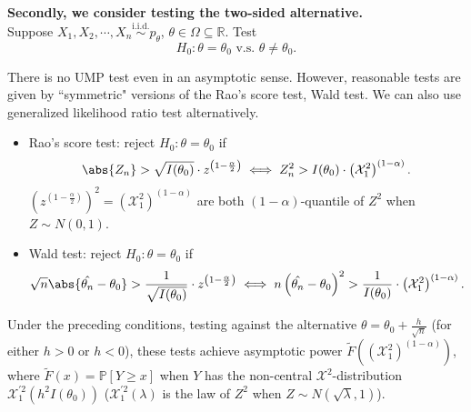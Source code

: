 \documentclass[a4paper]{article}
\begin{document}
\noindent \textbf{Secondly, we consider testing the two-sided alternative.} \\

\noindent Suppose $X_1,X_2,\cdots,X_n \stackrel{\text{i.i.d.}}{\sim} p_{\theta}$, $\theta \in \Omega \subseteq \mathbb{R}$. Test
\begin{equation*}
	H_0: \theta = \theta_0 \text{ v.s. } \theta \neq \theta_0.
\end{equation*}

\begin{answer}
	There is no UMP test even in an asymptotic sense. However, reasonable tests are given by ``symmetric" versions of the Rao's score test, Wald test. We can also use generalized likelihood ratio test alternatively.
\end{answer}

\begin{itemize}[leftmargin=*]
	\item Rao's score test: reject $H_0: \theta = \theta_0$ if
	\begin{equation*}
		\abs{Z_n} > \sqrt{I(\theta_0)} \cdot z^{\left(1-\frac{\alpha}{2}\right)} \iff Z_n^2 > I(\theta_0) \cdot \left(\mathcal{X}_1^2\right)^{(1-\alpha)}.
	\end{equation*}
	$\left(z^{(1-\frac{\alpha}{2})}\right)^2 = \left(\mathcal{X}_1^2\right)^{(1-\alpha)}$ are both $(1-\alpha)$-quantile of $Z^2$ when $Z \sim N(0,1)$.
	\item Wald test:  reject $H_0: \theta = \theta_0$ if
	\begin{equation*}
		\sqrt{n} \abs{\hat{\theta_n} - \theta_0} > \frac{1}{\sqrt{I(\theta_0)}} \cdot z^{\left(1-\frac{\alpha}{2}\right)} \iff n \left(\hat{\theta_n} - \theta_0\right)^2 > \frac{1}{I(\theta_0)} \cdot \left(\mathcal{X}_1^2\right)^{(1-\alpha)}.
	\end{equation*}
\end{itemize}

\begin{prop}
	Under the preceding conditions, testing against the alternative $\theta = \theta_0 + \frac{h}{\sqrt{n}}$ (for either $h > 0$ or $h < 0$), these tests achieve asymptotic power $\tilde{F} \left(\left(\mathcal{X}_1^2\right)^{(1-\alpha)}\right)$, where $\tilde{F}(x) = \mathbb{P}[Y \geq x]$ when $Y$ has the non-central $\mathcal{X}^2$-distribution $\mathcal{X}_1^{'2} \left(h^2 I(\theta_0)\right)$ ($\mathcal{X}_1^{'2}(\lambda)$ is the law of $Z^2$ when $Z \sim N(\sqrt{\lambda},1)$).
\end{prop}
\end{document}
